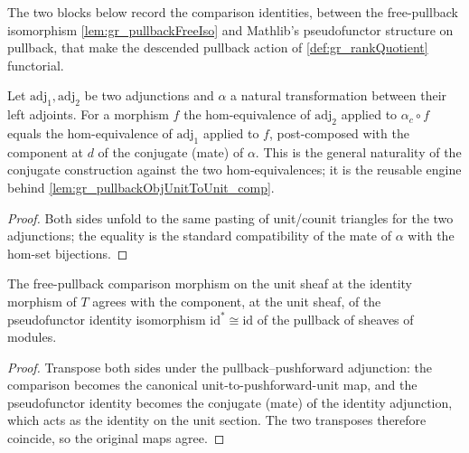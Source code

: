 The two blocks below record the comparison identities, between the free-pullback isomorphism
\cref{lem:gr_pullbackFreeIso} and Mathlib's pseudofunctor structure on pullback, that make
the descended pullback action of \cref{def:gr_rankQuotient} functorial.


\begin{lemma}\leanok
  \label{lem:gr_homEquiv_conjugateEquiv_app}
  Let \(\mathrm{adj}_1, \mathrm{adj}_2\) be two adjunctions and \(\alpha\) a natural
  transformation between their left adjoints. For a morphism \(f\) the hom-equivalence of
  \(\mathrm{adj}_2\) applied to \(\alpha_c \circ f\) equals the hom-equivalence of
  \(\mathrm{adj}_1\) applied to \(f\), post-composed with the component at \(d\) of the
  conjugate (mate) of \(\alpha\). This is the general naturality of the conjugate
  construction against the two hom-equivalences; it is the reusable engine behind
  \cref{lem:gr_pullbackObjUnitToUnit_comp}.
\end{lemma}

\begin{proof}


\leanok
  Both sides unfold to the same pasting of unit/counit triangles for the two adjunctions;
  the equality is the standard compatibility of the mate of \(\alpha\) with the
  hom-set bijections.
\end{proof}

\begin{lemma}\leanok
  \label{lem:gr_pullbackObjUnitToUnit_id}
  The free-pullback comparison morphism on the unit sheaf at the identity morphism of \(T\)
  agrees with the component, at the unit sheaf, of the pseudofunctor identity isomorphism
  \(\mathrm{id}^{*} \cong \mathrm{id}\) of the pullback of sheaves of modules.
\end{lemma}
\begin{proof}

\leanok
  Transpose both sides under the pullback--pushforward adjunction: the comparison becomes the
  canonical unit-to-pushforward-unit map, and the pseudofunctor identity becomes the conjugate
  (mate) of the identity adjunction, which acts as the identity on the unit section. The two
  transposes therefore coincide, so the original maps agree.
\end{proof}

